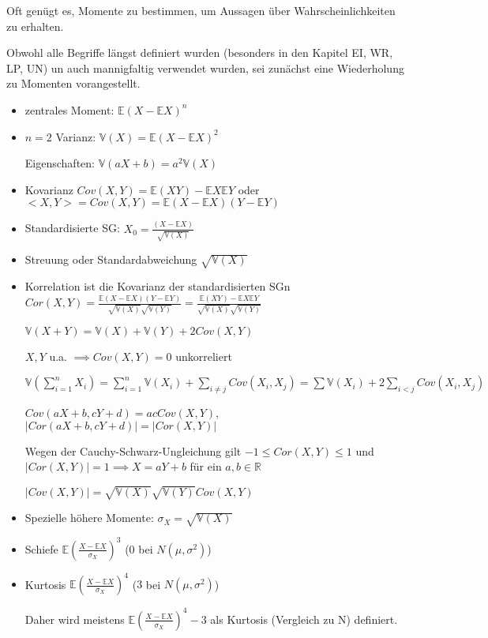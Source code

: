 \documentclass[]{article}
\begin{document}
Oft genügt es, Momente zu bestimmen, um Aussagen über Wahrscheinlichkeiten zu erhalten.

Obwohl alle Begriffe längst definiert wurden (besonders in den Kapitel EI, WR, LP, UN) un auch mannigfaltig verwendet wurden, sei zunächst eine Wiederholung zu Momenten vorangestellt.

\begin{itemize}
	\item zentrales Moment: $\mathbb{E}(X-\mathbb{E}X)^n$
	\item $n=2$ Varianz: $\mathbb{V}(X)=\mathbb{E}(X-\mathbb{E}X)^2$
	
	Eigenschaften: $\mathbb{V}(aX+b)=a^2\mathbb{V}(X)$
	
	\item Kovarianz $Cov(X,Y)=\mathbb{E}(XY)-\mathbb{E}X\mathbb{E}Y$ oder $<X,Y>=Cov(X,Y)=\mathbb{E}(X-\mathbb{E}X)(Y-\mathbb{E}Y)$
	
	\item Standardisierte SG: $X_0=\frac{(X-\mathbb{E}X)}{\sqrt{\mathbb{V}(X)}}$
	
	\item Streuung oder Standardabweichung $\sqrt{\mathbb{V}(X)}$
	
	\item Korrelation ist die Kovarianz der standardisierten SGn $Cor(X,Y)=\frac{\mathbb{E}(X-\mathbb{E}X)(Y-\mathbb{E}Y)}{\sqrt{\mathbb{V}(X)}\sqrt{\mathbb{V}(Y)}} = \frac{\mathbb{E}(XY)-\mathbb{E}X\mathbb{E}Y}{\sqrt{\mathbb{V}(X)}\sqrt{\mathbb{V}(Y)}}$
	
	$\mathbb{V}(X+Y)=\mathbb{V}(X) + \mathbb{V}(Y) + 2Cov(X,Y)$
	
	$X,Y$ u.a. $\implies Cov(X,Y)=0$ unkorreliert
	
	$\mathbb{V}(\sum_{i=1}^{n}X_i) = \sum_{i=1}^{n}\mathbb{V}(X_i) + \sum_{i\neq j}Cov(X_i, X_j) = \sum\mathbb{V}(X_i) + 2 \sum_{i<j}Cov(X_i, X_j)$
	
	$Cov(aX+b, cY+d) = ac Cov(X,Y)$, $|Cor(aX+b, cY+d)| = |Cor(X,Y)|$
	
	Wegen der Cauchy-Schwarz-Ungleichung gilt $-1\leq Cor(X,Y) \leq 1$ und $|Cor(X,Y)|=1 \implies X=aY+b$ für ein $a,b\in\mathbb{R}$
		
	$|Cov(X,Y)| = \sqrt{\mathbb{V}(X)}\sqrt{\mathbb{V}(Y)}Cov(X,Y)$
	
	\item Spezielle höhere Momente: $\sigma_X=\sqrt{\mathbb{V}(X)}$
	\item Schiefe $\mathbb{E}\left(\frac{X-\mathbb{E}X}{\sigma_X}\right)^3$ ($0$ bei $N(\mu, \sigma^2)$)
	\item Kurtosis $\mathbb{E}\left(\frac{X-\mathbb{E}X}{\sigma_X}\right)^4$ ($3$ bei $N(\mu, \sigma^2)$)
	
	Daher wird meistens $\mathbb{E}\left(\frac{X-\mathbb{E}X}{\sigma_X}\right)^4 - 3$ als Kurtosis (Vergleich zu N) definiert.
\end{itemize}
\end{document}
